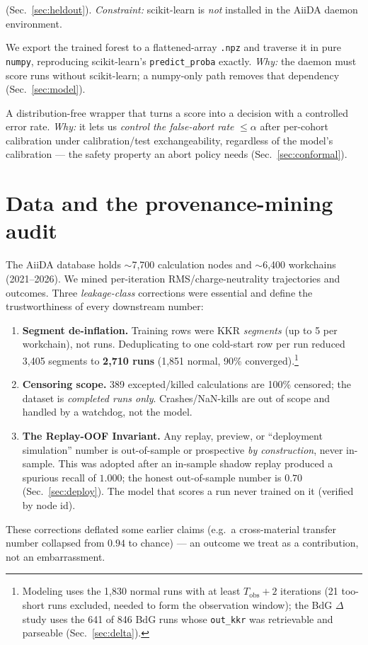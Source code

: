 \documentclass[11pt]{article}
\newcommand{\code}[1]{\texttt{#1}}
\begin{document}
\begin{description}[leftmargin=1.6em,itemsep=2pt]
  (Sec.~\ref{sec:heldout}). \emph{Constraint:} scikit-learn is \emph{not} installed in the AiiDA daemon
  environment.
  \item[numpy (inference).] We export the trained forest to a flattened-array \code{.npz} and traverse it
  in pure \code{numpy}, reproducing scikit-learn's \code{predict\_proba} exactly. \emph{Why:} the daemon
  must score runs without scikit-learn; a numpy-only path removes that dependency (Sec.~\ref{sec:model}).
  \item[Conformal prediction.] A distribution-free wrapper that turns a score into a decision with a
  controlled error rate. \emph{Why:} it lets us \emph{control the false-abort rate} $\le\alpha$ after
  per-cohort calibration under calibration/test exchangeability, regardless of the model's calibration ---
  the safety property an abort policy needs (Sec.~\ref{sec:conformal}).
\end{description}

\section{Data and the provenance-mining audit}
\label{sec:data}
The AiiDA database holds $\sim$7{,}700 calculation nodes and $\sim$6{,}400 workchains (2021--2026). We
mined per-iteration RMS/charge-neutrality trajectories and outcomes. Three \emph{leakage-class}
corrections were essential and define the trustworthiness of every downstream number:
\begin{enumerate}[leftmargin=1.6em,itemsep=1pt]
  \item \textbf{Segment de-inflation.} Training rows were KKR \emph{segments} (up to 5 per workchain),
  not runs. Deduplicating to one cold-start row per run reduced 3{,}405 segments to \textbf{2{,}710 runs}
  (1{,}851 normal, 90\% converged).\footnote{Modeling uses the 1{,}830 normal runs with at least
  $T_{\mathrm{obs}}{+}2$ iterations (21 too-short runs excluded, needed to form the observation window);
  the BdG $\Delta$ study uses the 641 of 846 BdG runs whose \code{out\_kkr} was retrievable and parseable
  (Sec.~\ref{sec:delta}).}
  \item \textbf{Censoring scope.} 389 excepted/killed calculations are 100\% censored; the dataset is
  \emph{completed runs only}. Crashes/NaN-kills are out of scope and handled by a watchdog, not the model.
  \item \textbf{The Replay-OOF Invariant.} Any replay, preview, or ``deployment simulation'' number is
  out-of-sample or prospective \emph{by construction}, never in-sample. This was adopted after an in-sample
  shadow replay produced a spurious recall of $1.000$; the honest out-of-sample number is $0.70$
  (Sec.~\ref{sec:deploy}). The model that scores a run never trained on it (verified by node id).
\end{enumerate}
These corrections deflated some earlier claims (e.g.\ a cross-material transfer number collapsed from
$0.94$ to chance) --- an outcome we treat as a contribution, not an embarrassment.
\end{document}
